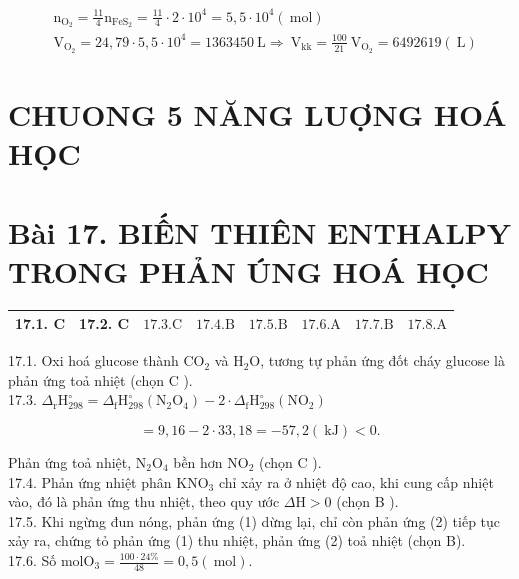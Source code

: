 \documentclass[10pt]{article}
\begin{document}
$$
\begin{aligned}
& \mathrm{n}_{\mathrm{O}_{2}}=\frac{11}{4} \mathrm{n}_{\mathrm{FeS}_{2}}=\frac{11}{4} \cdot 2 \cdot 10^{4}=5,5 \cdot 10^{4}(\mathrm{~mol}) \\
& \mathrm{V}_{\mathrm{O}_{2}}=24,79 \cdot 5,5 \cdot 10^{4}=1363450 \mathrm{~L} \Rightarrow \mathrm{~V}_{\mathrm{kk}}=\frac{100}{21} \mathrm{~V}_{\mathrm{O}_{2}}=6492619(\mathrm{~L})
\end{aligned}
$$

\section*{CHUONG 5 NĂNG LUỢNG HOÁ HỌC}
\section*{Bài 17. BIẾN THIÊN ENTHALPY TRONG PHẢN ÚNG HOÁ HỌC}
\begin{center}
\begin{tabular}{|l|l|l|l|l|l|l|l|}
\hline
17.1. C & 17.2. C & $17.3 . \mathrm{C}$ & $17.4 . \mathrm{B}$ & $17.5 . \mathrm{B}$ & $17.6 . \mathrm{A}$ & $17.7 . \mathrm{B}$ & $17.8 . \mathrm{A}$ \\
\hline
\end{tabular}
\end{center}

17.1. Oxi hoá glucose thành $\mathrm{CO}_{2}$ và $\mathrm{H}_{2} \mathrm{O}$, tương tự phản ứng đốt cháy glucose là phản ứng toả nhiệt (chọn C ).\\
17.3. $\Delta_{\mathrm{r}} \mathrm{H}_{298}^{\circ}=\Delta_{\mathrm{f}} \mathrm{H}_{298}^{\circ}\left(\mathrm{N}_{2} \mathrm{O}_{4}\right)-2 \cdot \Delta_{\mathrm{f}} \mathrm{H}_{298}^{\circ}\left(\mathrm{NO}_{2}\right)$

$$
=9,16-2 \cdot 33,18=-57,2(\mathrm{~kJ})<0 .
$$

Phản ứng toả nhiệt, $\mathrm{N}_{2} \mathrm{O}_{4}$ bền hơn $\mathrm{NO}_{2}$ (chọn C ).\\
17.4. Phản ứng nhiệt phân $\mathrm{KNO}_{3}$ chỉ xảy ra ở nhiệt độ cao, khi cung cấp nhiệt vào, đó là phản ứng thu nhiệt, theo quy ước $\Delta \mathrm{H}>0$ (chọn B ).\\
17.5. Khi ngừng đun nóng, phản ứng (1) dừng lại, chỉ còn phản ứng (2) tiếp tục xảy ra, chứng tỏ phản ứng (1) thu nhiệt, phản ứng (2) toả nhiệt (chọn B).\\
17.6. Số $\mathrm{mol} \mathrm{O}_{3}=\frac{100 \cdot 24 \%}{48}=0,5(\mathrm{~mol})$.
\end{document}
